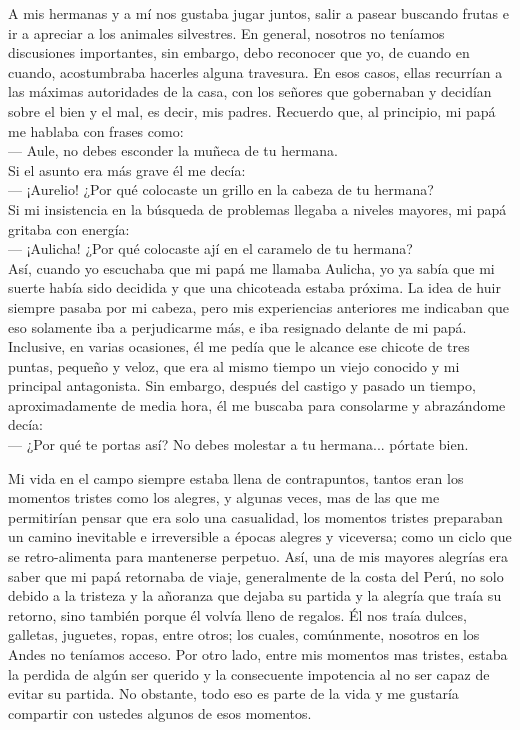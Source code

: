 A mis hermanas y a mí nos gustaba jugar juntos, salir a pasear buscando frutas e ir a apreciar a los animales silvestres. En general, nosotros no teníamos discusiones importantes, sin embargo, debo reconocer que yo, de cuando en cuando, acostumbraba hacerles alguna travesura.
En esos casos, ellas recurrían a las máximas autoridades de la casa, con los señores que gobernaban y decidían sobre el bien y el mal, es decir, mis padres. 
Recuerdo que, al principio, mi papá me hablaba con frases como:\\\indent
--- Aule, no debes esconder la muñeca de tu hermana.\\\indent
Si el asunto era más grave él me decía: \\\indent
--- ¡Aurelio! ¿Por qué colocaste un grillo en la cabeza de tu hermana?\\\indent
Si mi insistencia en la búsqueda de problemas llegaba a niveles mayores, mi papá gritaba con energía:\\\indent
--- ¡Aulicha! ¿Por qué colocaste ají en el caramelo de tu hermana?\\\indent
Así, cuando yo escuchaba que mi papá me llamaba Aulicha, yo ya sabía que mi suerte había sido decidida y que una chicoteada estaba próxima. La idea de huir siempre pasaba por mi cabeza, pero mis experiencias anteriores me indicaban que eso solamente iba a perjudicarme más, e iba resignado delante de mi papá. Inclusive, en varias ocasiones, él me pedía que le alcance ese chicote de tres puntas, pequeño y veloz, que era al mismo tiempo un viejo conocido y mi principal antagonista. 
Sin embargo, después del castigo y pasado un tiempo, aproximadamente de media hora,
él me buscaba para consolarme y abrazándome decía:\\\indent
--- ¿Por qué te portas así? No debes molestar a tu hermana... pórtate bien.

Mi vida en el campo siempre estaba llena de contrapuntos, tantos eran los momentos tristes como los alegres, y  algunas veces, mas de las que me permitirían pensar que era solo una casualidad, los momentos tristes preparaban un camino inevitable e irreversible a épocas alegres y viceversa; como un ciclo que se retro-alimenta para mantenerse perpetuo.
Así, una de mis mayores alegrías era saber que mi papá retornaba de viaje, generalmente de la costa del Perú, no solo debido a la tristeza y la añoranza que dejaba su partida y la alegría que traía su retorno, sino también porque él volvía lleno de regalos. 
Él nos traía dulces, galletas, juguetes, ropas, entre otros; los cuales, comúnmente, nosotros en los Andes no teníamos acceso.
Por otro lado, entre mis momentos mas tristes, estaba la perdida de algún ser querido y la consecuente impotencia al no ser capaz de evitar su partida.
No obstante, todo eso es parte de la vida y me gustaría compartir con ustedes algunos de esos momentos.





